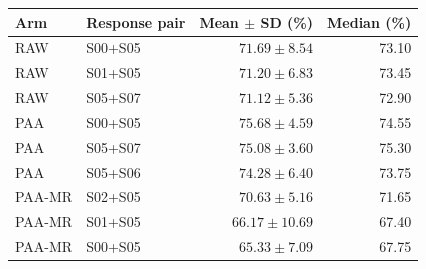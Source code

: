 \begin{tabular}{llrr}
\toprule
Arm & Response pair & Mean $\pm$ SD (\%) & Median (\%) \\
\midrule
RAW & S00+S05 & $71.69 \pm 8.54$ & 73.10 \\
RAW & S01+S05 & $71.20 \pm 6.83$ & 73.45 \\
RAW & S05+S07 & $71.12 \pm 5.36$ & 72.90 \\
PAA & S00+S05 & $75.68 \pm 4.59$ & 74.55 \\
PAA & S05+S07 & $75.08 \pm 3.60$ & 75.30 \\
PAA & S05+S06 & $74.28 \pm 6.40$ & 73.75 \\
PAA-MR & S02+S05 & $70.63 \pm 5.16$ & 71.65 \\
PAA-MR & S01+S05 & $66.17 \pm 10.69$ & 67.40 \\
PAA-MR & S00+S05 & $65.33 \pm 7.09$ & 67.75 \\
\bottomrule
\end{tabular}
